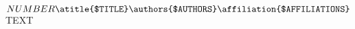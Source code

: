 $NUMBER

\atitle{$TITLE}

\bigskip

\authors{$AUTHORS}

\affiliation{$AFFILIATIONS}

\bigskip

\noindent $TEXT

